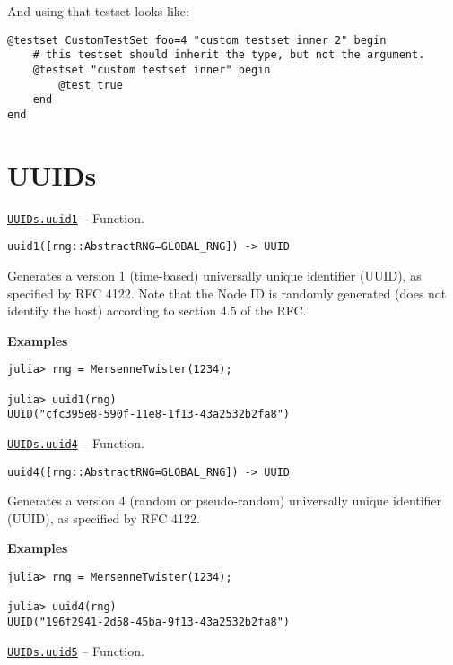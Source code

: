 And using that testset looks like:




\begin{verbatim}
@testset CustomTestSet foo=4 "custom testset inner 2" begin
    # this testset should inherit the type, but not the argument.
    @testset "custom testset inner" begin
        @test true
    end
end
\end{verbatim}





\hypertarget{2767829618755343548}{}


\chapter{UUIDs}


\hypertarget{16892127995397163681}{} 
\hyperlink{16892127995397163681}{\texttt{UUIDs.uuid1}}  -- {Function.}

\begin{adjustwidth}{2em}{0pt}


\begin{verbatim}
uuid1([rng::AbstractRNG=GLOBAL_RNG]) -> UUID
\end{verbatim}

Generates a version 1 (time-based) universally unique identifier (UUID), as specified by RFC 4122. Note that the Node ID is randomly generated (does not identify the host) according to section 4.5 of the RFC.

\textbf{Examples}


\begin{verbatim}
julia> rng = MersenneTwister(1234);

julia> uuid1(rng)
UUID("cfc395e8-590f-11e8-1f13-43a2532b2fa8")
\end{verbatim}



\end{adjustwidth}
\hypertarget{15125074142528432744}{} 
\hyperlink{15125074142528432744}{\texttt{UUIDs.uuid4}}  -- {Function.}

\begin{adjustwidth}{2em}{0pt}


\begin{verbatim}
uuid4([rng::AbstractRNG=GLOBAL_RNG]) -> UUID
\end{verbatim}

Generates a version 4 (random or pseudo-random) universally unique identifier (UUID), as specified by RFC 4122.

\textbf{Examples}


\begin{verbatim}
julia> rng = MersenneTwister(1234);

julia> uuid4(rng)
UUID("196f2941-2d58-45ba-9f13-43a2532b2fa8")
\end{verbatim}



\end{adjustwidth}
\hypertarget{16798189732863707215}{} 
\hyperlink{16798189732863707215}{\texttt{UUIDs.uuid5}}  -- {Function.}

